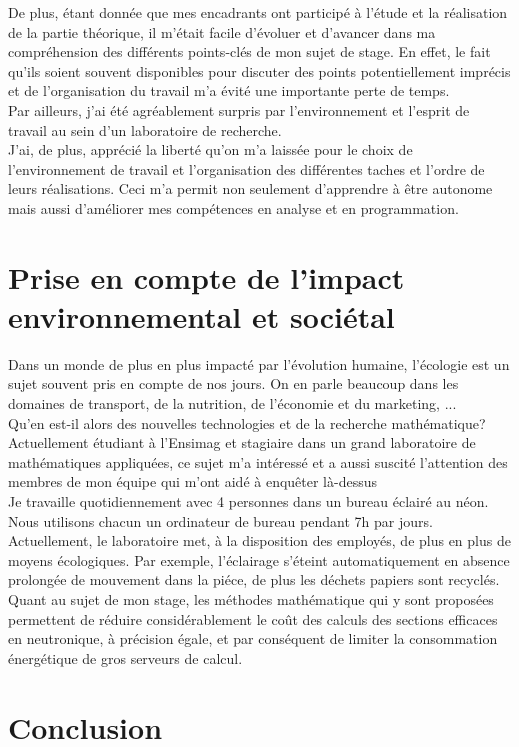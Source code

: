 De plus, étant donnée que mes encadrants ont participé à l'étude et la réalisation de la partie théorique, il m'était facile d'évoluer
et d'avancer dans ma compréhension des différents points-clés de mon sujet de stage. En effet, le fait qu'ils soient souvent disponibles
pour discuter des points potentiellement imprécis et de l'organisation du travail m'a évité une importante perte de temps.\\
Par ailleurs, j'ai été agréablement surpris par l'environnement et l'esprit de travail au sein d'un laboratoire de recherche.\\
J'ai, de plus, apprécié la liberté qu'on m'a laissée pour le choix de l'environnement de travail et l'organisation des différentes taches et l'ordre de leurs réalisations.
Ceci m'a permit non seulement d'apprendre à être autonome mais aussi d'améliorer mes compétences en analyse et en programmation.

\section{Prise en compte de l’impact environnemental et sociétal}\label{sec:8}
\hspace{0.5cm}
Dans un monde de plus en plus impacté par l’évolution humaine, l’écologie est un sujet
souvent pris en compte de nos jours. On en parle beaucoup dans les domaines de transport, de la nutrition, de l'économie et du marketing, ...\\
Qu’en est-il alors des nouvelles technologies et de la recherche mathématique?\\

Actuellement étudiant à l’Ensimag et stagiaire dans un grand laboratoire de mathématiques appliquées,
ce sujet m'a intéressé et a aussi suscité l’attention des membres de mon équipe qui m’ont aidé à enquêter là-dessus\\
Je travaille quotidiennement avec 4 personnes dans un bureau éclairé au néon.
Nous utilisons chacun un ordinateur de bureau pendant 7h par jours.\\
Actuellement, le laboratoire met, à la disposition des employés, de plus en plus de moyens écologiques.
Par exemple, l’éclairage s’éteint automatiquement en absence prolongée de mouvement dans la piéce, de plus les déchets papiers sont recyclés.\\
Quant au sujet de mon stage, les méthodes mathématique qui y sont proposées permettent de réduire considérablement le coût des calculs des sections efficaces en neutronique,
à précision égale, et par conséquent de limiter la consommation énergétique de gros serveurs de calcul.

\section{Conclusion}\label{sec:9}

\newpage




